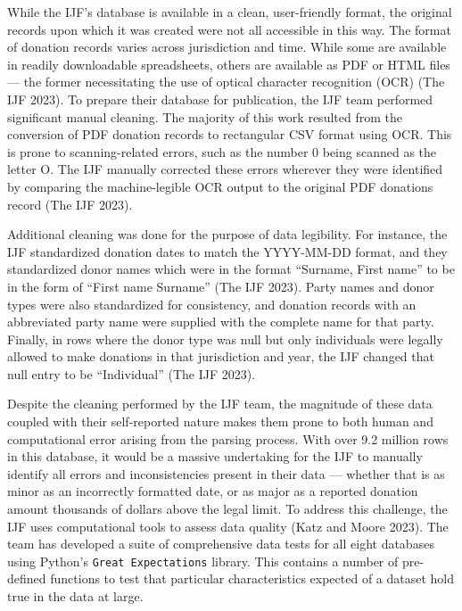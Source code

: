 \documentclass[
  letterpaper,
  DIV=11,
  numbers=noendperiod]{scrartcl}
\begin{document}
While the IJF's database is available in a clean, user-friendly format,
the original records upon which it was created were not all accessible
in this way. The format of donation records varies across jurisdiction
and time. While some are available in readily downloadable spreadsheets,
others are available as PDF or HTML files --- the former necessitating
the use of optical character recognition (OCR) (The IJF 2023). To
prepare their database for publication, the IJF team performed
significant manual cleaning. The majority of this work resulted from the
conversion of PDF donation records to rectangular CSV format using OCR.
This is prone to scanning-related errors, such as the number 0 being
scanned as the letter O. The IJF manually corrected these errors
wherever they were identified by comparing the machine-legible OCR
output to the original PDF donations record (The IJF 2023).

Additional cleaning was done for the purpose of data legibility. For
instance, the IJF standardized donation dates to match the YYYY-MM-DD
format, and they standardized donor names which were in the format
``Surname, First name'' to be in the form of ``First name Surname'' (The
IJF 2023). Party names and donor types were also standardized for
consistency, and donation records with an abbreviated party name were
supplied with the complete name for that party. Finally, in rows where
the donor type was null but only individuals were legally allowed to
make donations in that jurisdiction and year, the IJF changed that null
entry to be ``Individual'' (The IJF 2023).

Despite the cleaning performed by the IJF team, the magnitude of these
data coupled with their self-reported nature makes them prone to both
human and computational error arising from the parsing process. With
over 9.2 million rows in this database, it would be a massive
undertaking for the IJF to manually identify all errors and
inconsistencies present in their data --- whether that is as minor as an
incorrectly formatted date, or as major as a reported donation amount
thousands of dollars above the legal limit. To address this challenge,
the IJF uses computational tools to assess data quality (Katz and Moore
2023). The team has developed a suite of comprehensive data tests for
all eight databases using Python's \texttt{Great\ Expectations} library.
This contains a number of pre-defined functions to test that particular
characteristics expected of a dataset hold true in the data at large.
\end{document}
